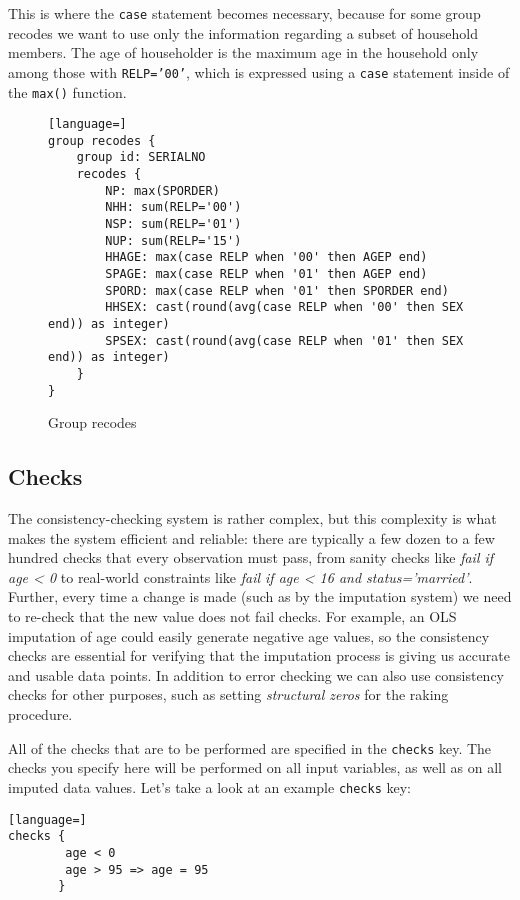\documentclass{article}
\begin{document}
This is where the {\tt case} statement becomes necessary, because for some group recodes
we want to use only the information regarding a subset of household members.  The age of
householder is the maximum age in the household only among those with {\tt RELP='00'},
which is expressed using a {\tt case} statement inside of the {\tt max()} function.

\begin{figure}
\begin{lstlisting}[language=]
group recodes {
    group id: SERIALNO
    recodes {
        NP: max(SPORDER)
        NHH: sum(RELP='00')
        NSP: sum(RELP='01')
        NUP: sum(RELP='15')
        HHAGE: max(case RELP when '00' then AGEP end)
        SPAGE: max(case RELP when '01' then AGEP end)
        SPORD: max(case RELP when '01' then SPORDER end)
        HHSEX: cast(round(avg(case RELP when '00' then SEX end)) as integer)
        SPSEX: cast(round(avg(case RELP when '01' then SEX end)) as integer)
    }
}
\end{lstlisting}
\caption{Group recodes}\label{morerecodes}
\end{figure}

\subsection{Checks}
The consistency-checking system is rather complex, but this complexity is what makes
the system efficient and reliable: there are typically a few dozen to a few hundred
checks that every observation must pass, from sanity checks like {\em fail if age < 0}
to real-world constraints like {\em fail if age < 16 and status='married'}. Further,
every time a change is made (such as by the imputation system) we need to re-check that
the new value does not fail checks. For example, an OLS imputation of age could easily
generate negative age values, so the consistency checks are essential for verifying that
the imputation process is giving us accurate and usable data points. In addition to
error checking we can also use consistency checks for other purposes, such as setting
{\em structural zeros} for the raking procedure.

All of the checks that are to be performed are specified in the {\tt checks} key. 
The checks you specify here will be performed on all input variables, as well as on all 
imputed data values. Let's take a look at an example {\tt checks} key:

\begin{lstlisting}[language=]
checks {
    	age < 0
        age > 95 => age = 95
       }
\end{lstlisting}
\end{document}
